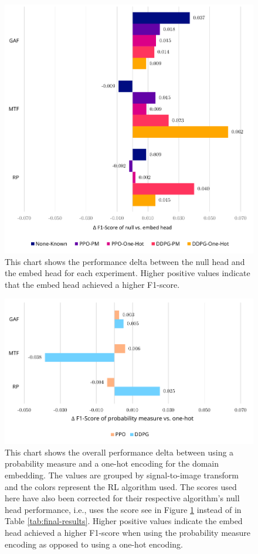 \begin{figure}
	\centering
	\includegraphics[width=6in]{figures/results_delta}
	\caption{This chart shows the performance delta between the null head and the embed head for each experiment.  Higher positive values indicate that the embed head achieved a higher F1-score.}
	\label{fig:results-delta}
\end{figure}

\begin{figure}
	\centering
	\includegraphics[width=6in]{figures/results_encoding}
	\caption{This chart shows the overall performance delta between using a probability measure and a one-hot encoding for the domain embedding. The values are grouped by signal-to-image transform and the colors represent the RL algorithm used. The scores used here have also been corrected for their respective algorithm's null head performance, i.e., uses the score see in Figure \ref{fig:results-delta} instead of in Table \ref{tab:final-results}. Higher positive values indicate the embed head achieved a higher F1-score when using the probability measure encoding as opposed to using a one-hot encoding.}
	\label{fig:results-encoding}
\end{figure}

